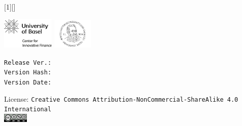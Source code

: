 [1][]
{
  \vspace{-0cm}\hfill\includegraphics[width=2.5cm]{../config/logo_cif}
  \includegraphics[width=1.9cm]{../config/seal_wwz}
  \\ \vspace{2em}
  \textbf{\inserttitle}\par
  \insertsubtitle\par  \vspace{1.5em}
  \small{}\insertauthor\par
  \insertinstitute\par \vspace{2em}
  \inserttitlegraphic
    \tiny \noindent \texttt{Release Ver.: \gitRelease}\\ 
    \texttt{Version Hash: \gitSHA}\\
    \texttt{Version Date: \gitDate}\\ \vspace{1em}
    
    

  
  \vspace{1em}
  License: \texttt{Creative Commons Attribution-NonCommercial-ShareAlike 4.0 International}\\\vspace{2em}
  \includegraphics[width = 1.2cm]{../config/license}
}


\usetikzlibrary{decorations.pathreplacing}
\usetikzlibrary{decorations.markings}
\usetikzlibrary{positioning}
\usetikzlibrary{calc}
\usetikzlibrary{shapes}
\captionsetup{font=footnotesize}



